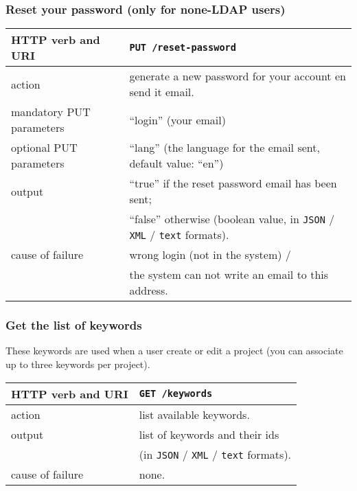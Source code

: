 \subsubsection{Reset your password (only for none-LDAP users)}
\begin{tabular}{ | l | l | }
	\hline
	HTTP verb and URI & \texttt{PUT /reset-password} \\
	\hline
	action & generate a new password for your account en send it \via email. \\
	\hline
	mandatory PUT parameters & ``login'' (your email) \\
	\hline
	optional  PUT parameters & ``lang'' (the language for the email sent, default value: ``en'') \\
	\hline
	output & ``true'' if the reset password email has been sent; \\
	\space & ``false'' otherwise (boolean value, in \texttt{JSON} / \texttt{XML} / \texttt{text} formats). \\
	\hline
	cause of failure & wrong login (not in the system) / \\
	\space & the system can not write an email to this address. \\
	\hline
\end{tabular}
\newline

\subsubsection{Get the list of keywords}
\hspace*{\parindent}
These keywords are used when a user create or edit a project
(you can associate up to three keywords per project).
\newline
\begin{tabular}{ | l | l | }
	\hline
	HTTP verb and URI & \texttt{GET /keywords} \\
	\hline
	action & list available keywords. \\
	\hline
	output & list of keywords and their ids \\
	\space & (in \texttt{JSON} / \texttt{XML} / \texttt{text} formats). \\
	\hline
	cause of failure & none. \\
	\hline
\end{tabular}
\newline

